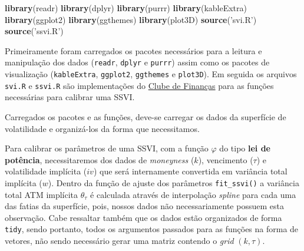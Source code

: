 \documentclass[]{book}
\newenvironment{Shaded}{\begin{snugshade}}{\end{snugshade}}
\newcommand{\DataTypeTok}[1]{\textcolor[rgb]{0.13,0.29,0.53}{#1}}
\newcommand{\DecValTok}[1]{\textcolor[rgb]{0.00,0.00,0.81}{#1}}
\newcommand{\KeywordTok}[1]{\textcolor[rgb]{0.13,0.29,0.53}{\textbf{#1}}}
\newcommand{\NormalTok}[1]{#1}
\newcommand{\OperatorTok}[1]{\textcolor[rgb]{0.81,0.36,0.00}{\textbf{#1}}}
\newcommand{\StringTok}[1]{\textcolor[rgb]{0.31,0.60,0.02}{#1}}
\theoremstyle{definition}
\theoremstyle{definition}
\theoremstyle{definition}
\theoremstyle{remark}
\begin{document}
\begin{Shaded}
\begin{Highlighting}[]
\KeywordTok{library}\NormalTok{(readr)}
\KeywordTok{library}\NormalTok{(dplyr)}
\KeywordTok{library}\NormalTok{(purrr)}
\KeywordTok{library}\NormalTok{(kableExtra)}
\KeywordTok{library}\NormalTok{(ggplot2)}
\KeywordTok{library}\NormalTok{(ggthemes)}
\KeywordTok{library}\NormalTok{(plot3D)}
\KeywordTok{source}\NormalTok{(}\StringTok{'svi.R'}\NormalTok{)}
\KeywordTok{source}\NormalTok{(}\StringTok{'ssvi.R'}\NormalTok{)}
\end{Highlighting}
\end{Shaded}

Primeiramente foram carregados os pacotes necessários para a leitura e manipulação dos dados (\texttt{readr}, \texttt{dplyr} e \texttt{purrr}) assim como os pacotes de visualização (\texttt{kableExtra}, \texttt{ggplot2}, \texttt{ggthemes} e \texttt{plot3D}). Em seguida os arquivos \texttt{svi.R} e \texttt{ssvi.R} são implementações do \href{http://clubedefinancas.com.br/}{Clube de Finanças} para as funções necessárias para calibrar uma SSVI.

Carregados os pacotes e as funções, deve-se carregar os dados da superfície de volatilidade e organizá-los da forma que necessitamos.

\begin{Shaded}
\end{Shaded}

Para calibrar os parâmetros de uma SSVI, com a função \(\varphi\) do tipo \textbf{lei de potência}, necessitaremos dos dados de \emph{moneyness} (\(k\)), vencimento (\(\tau\)) e volatilidade implícita (\(iv\)) que será internamente convertida em variância total implícita (\(w\)). Dentro da função de ajuste dos parâmetros \texttt{fit\_ssvi()} a variância total ATM implícita \(\theta_\tau\) é calculada através de interpolação \emph{spline} para cada uma das fatias da superfície, pois, nossos dados não necessariamente possuem esta observação. Cabe ressaltar também que os dados estão organizados de forma \texttt{tidy}, sendo portanto, todos os argumentos passados para as funções na forma de vetores, não sendo necessário gerar uma matriz contendo o \emph{grid} \((k, \tau)\).
\end{document}
